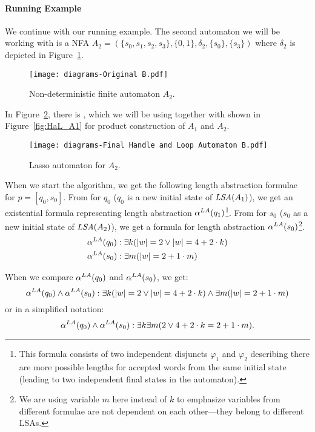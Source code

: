 \paragraph{Running Example}

We continue with our running example. The second automaton we will be working with is a NFA $A_2 = (\{s_0, s_1, s_2, s_3\}, \{0, 1\}, \delta_2, \{s_0\}, \{s_3\}) $ where $\delta_2$ is depicted in Figure~\ref{fig:NFA_A2_orig}.

\begin{figure}[ht]
    \centering
	\texttt{[image: diagrams-Original B.pdf]}
	\caption{Non-deterministic finite automaton $A_2$.}
	\label{fig:NFA_A2_orig}
\end{figure}

In Figure~\ref{fig:HaL_A2}, there is , which we will be using together with  shown in Figure~\ref{fig:HaL_A1} for product construction of $A_1$ and $A_2$.

\begin{figure}[ht]
    \centering
	\texttt{[image: diagrams-Final Handle and Loop Automaton B.pdf]}
	\caption{Lasso automaton  for $A_2$.}
	\label{fig:HaL_A2}
\end{figure}

When we start the algorithm, we get the following length abstraction formulae for $p = [q_0, s_0]$. From  for $q_0$ ($q_0$ is a new initial state of $\emph{LSA}(A_1)$), we get an existential formula representing length abstraction $\alpha^{LA}(q_1)$\footnote{This formula consists of two independent disjuncts $\varphi_1$ and $\varphi_2$ describing there are more possible lengths for accepted words from the same initial state (leading to two independent final states in the automaton).}. From  for $s_0$ ($s_0$ as a new initial state of $\emph{LSA}(A_2)$), we get a formula for length abstraction $\alpha^{LA}(s_0)$\footnote{We are using variable $m$ here instead of $k$ to emphasize variables from different formulae are not dependent on each other---they belong to different LSAs.}.
\begin{align*}
    &\alpha^{LA}(q_0): \exists k ( |w| = 2 \lor |w| = 4 + 2 \cdot k ) \\
    &\alpha^{LA}(s_0): \exists m ( |w| = 2 + 1 \cdot m )
\end{align*}

When we compare $\alpha^{LA}(q_0)$ and $\alpha^{LA}(s_0)$, we get:
\[
    \alpha^{LA}(q_0) \land \alpha^{LA}(s_0) : \exists k ( |w| = 2 \lor |w| = 4 + 2 \cdot k ) \land \exists m ( |w| = 2 + 1 \cdot m )
\]
or in a simplified notation:
$$ \alpha^{LA}(q_0) \land \alpha^{LA}(s_0) : \exists k \exists m ( 2 \lor 4 + 2 \cdot k = 2 + 1 \cdot m ) \text{.} $$

